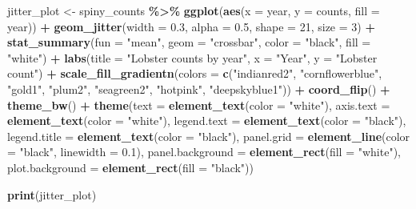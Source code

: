\documentclass[
]{article}
\newenvironment{Shaded}{\begin{snugshade}}{\end{snugshade}}
\newcommand{\AttributeTok}[1]{\textcolor[rgb]{0.13,0.29,0.53}{#1}}
\newcommand{\DecValTok}[1]{\textcolor[rgb]{0.00,0.00,0.81}{#1}}
\newcommand{\FloatTok}[1]{\textcolor[rgb]{0.00,0.00,0.81}{#1}}
\newcommand{\FunctionTok}[1]{\textcolor[rgb]{0.13,0.29,0.53}{\textbf{#1}}}
\newcommand{\NormalTok}[1]{#1}
\newcommand{\OtherTok}[1]{\textcolor[rgb]{0.56,0.35,0.01}{#1}}
\newcommand{\SpecialCharTok}[1]{\textcolor[rgb]{0.81,0.36,0.00}{\textbf{#1}}}
\newcommand{\StringTok}[1]{\textcolor[rgb]{0.31,0.60,0.02}{#1}}
\begin{document}
\begin{Shaded}
\begin{Highlighting}[]
\NormalTok{jitter\_plot }\OtherTok{\textless{}{-}}\NormalTok{ spiny\_counts }\SpecialCharTok{\%\textgreater{}\%}
  \FunctionTok{ggplot}\NormalTok{(}\FunctionTok{aes}\NormalTok{(}\AttributeTok{x =}\NormalTok{ year, }\AttributeTok{y =}\NormalTok{ counts, }
             \AttributeTok{fill =}\NormalTok{ year)) }\SpecialCharTok{+}
  \FunctionTok{geom\_jitter}\NormalTok{(}\AttributeTok{width =} \FloatTok{0.3}\NormalTok{,}
              \AttributeTok{alpha =} \FloatTok{0.5}\NormalTok{,}
              \AttributeTok{shape =} \DecValTok{21}\NormalTok{,}
              \AttributeTok{size =} \DecValTok{3}\NormalTok{) }\SpecialCharTok{+}
  \FunctionTok{stat\_summary}\NormalTok{(}\AttributeTok{fun =} \StringTok{"mean"}\NormalTok{,}
               \AttributeTok{geom =} \StringTok{"crossbar"}\NormalTok{,}
               \AttributeTok{color =} \StringTok{"black"}\NormalTok{,}
               \AttributeTok{fill =} \StringTok{"white"}\NormalTok{) }\SpecialCharTok{+}
  \FunctionTok{labs}\NormalTok{(}\AttributeTok{title =} \StringTok{"Lobster counts by year"}\NormalTok{,}
       \AttributeTok{x =} \StringTok{"Year"}\NormalTok{, }
       \AttributeTok{y =} \StringTok{"Lobster count"}\NormalTok{) }\SpecialCharTok{+}
  \FunctionTok{scale\_fill\_gradientn}\NormalTok{(}\AttributeTok{colors =} \FunctionTok{c}\NormalTok{(}\StringTok{"indianred2"}\NormalTok{, }
                                  \StringTok{"cornflowerblue"}\NormalTok{,}
                                  \StringTok{"gold1"}\NormalTok{, }
                                  \StringTok{"plum2"}\NormalTok{, }
                                  \StringTok{"seagreen2"}\NormalTok{,}
                                  \StringTok{"hotpink"}\NormalTok{,}
                                  \StringTok{"deepskyblue1"}\NormalTok{)) }\SpecialCharTok{+}
  \FunctionTok{coord\_flip}\NormalTok{() }\SpecialCharTok{+} 
  \FunctionTok{theme\_bw}\NormalTok{() }\SpecialCharTok{+}
  \FunctionTok{theme}\NormalTok{(}\AttributeTok{text =} \FunctionTok{element\_text}\NormalTok{(}\AttributeTok{color =} \StringTok{"white"}\NormalTok{),}
        \AttributeTok{axis.text =} \FunctionTok{element\_text}\NormalTok{(}\AttributeTok{color =} \StringTok{"white"}\NormalTok{),}
        \AttributeTok{legend.text =} \FunctionTok{element\_text}\NormalTok{(}\AttributeTok{color =} \StringTok{"black"}\NormalTok{),}
        \AttributeTok{legend.title =} \FunctionTok{element\_text}\NormalTok{(}\AttributeTok{color =} \StringTok{"black"}\NormalTok{),}
        \AttributeTok{panel.grid =} \FunctionTok{element\_line}\NormalTok{(}\AttributeTok{color =} \StringTok{"black"}\NormalTok{,}
                                  \AttributeTok{linewidth =} \FloatTok{0.1}\NormalTok{),}
        \AttributeTok{panel.background =} \FunctionTok{element\_rect}\NormalTok{(}\AttributeTok{fill =} \StringTok{"white"}\NormalTok{),}
        \AttributeTok{plot.background =} \FunctionTok{element\_rect}\NormalTok{(}\AttributeTok{fill =} \StringTok{"black"}\NormalTok{))}

\FunctionTok{print}\NormalTok{(jitter\_plot)}
\end{Highlighting}
\end{Shaded}
\end{document}
